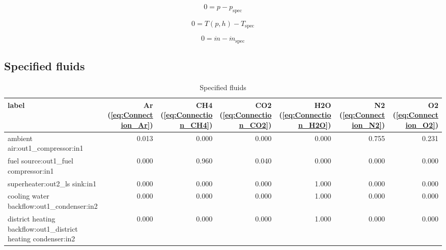 \begin{equation}
\label{eq:Connection_pressure}
0 = p - p_\mathrm{spec}
\end{equation}

\begin{equation}
\label{eq:Connection_temperature}
0 = T \left(p, h \right) - T_\mathrm{spec}
\end{equation}

\begin{equation}
\label{eq:Connection_mass flow}
0 = \dot{m} - \dot{m}_\mathrm{spec}
\end{equation}

\subsection{Specified fluids}

\begin{table}[H]\begin{center}
\begin{tabular}{lrrrrrr}
\toprule
                                                          label &  Ar (\ref{eq:Connection_Ar}) &  CH4 (\ref{eq:Connection_CH4}) &  CO2 (\ref{eq:Connection_CO2}) &  H2O (\ref{eq:Connection_H2O}) &  N2 (\ref{eq:Connection_N2}) &  O2 (\ref{eq:Connection_O2}) \\
\midrule
                               ambient air:out1\_compressor:in1 &                        0.013 &                          0.000 &                          0.000 &                          0.000 &                        0.755 &                        0.231 \\
                          fuel source:out1\_fuel compressor:in1 &                        0.000 &                          0.960 &                          0.040 &                          0.000 &                        0.000 &                        0.000 \\
                                  superheater:out2\_ls sink:in1 &                        0.000 &                          0.000 &                          0.000 &                          1.000 &                        0.000 &                        0.000 \\
                     cooling water backflow:out1\_condenser:in2 &                        0.000 &                          0.000 &                          0.000 &                          1.000 &                        0.000 &                        0.000 \\
 district heating backflow:out1\_district heating condenser:in2 &                        0.000 &                          0.000 &                          0.000 &                          1.000 &                        0.000 &                        0.000 \\
\bottomrule
\end{tabular}
\caption{Specified fluids}
\end{center}\end{table}

